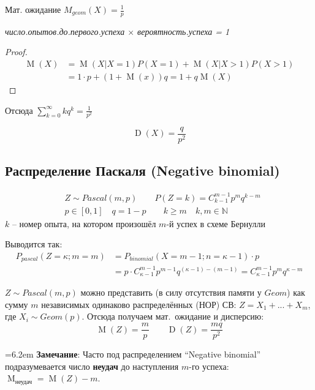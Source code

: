 \documentclass[a4paper,12pt,fleqn]{article}
\newenvironment{onsamepage} {\begin{minipage}{\textwidth}} {\end{minipage}}
\numberwithin{figure}{section}
\theoremstyle{definition}
\let\geqs\geqslant
\def\N{\mathbb{N}}
\DeclareMathOperator{\M}{M}
\DeclareMathOperator{\D}{D}
\begin{document}
\begin{onsamepage}
Мат. ожидание $M_{geom}(X) = \frac1p$
{\par\centering\it число.опытов.до.первого.успеха $\times$ вероятность.успеха = \rm1 \par}
\begin{proof}
\begin{align*}
 \M(X) &= \M(X|X=1) P(X=1) + \M(X|X>1) P(X>1) \\
	   &= 1\cdot p + (1+\M(x))q = 1 + q \M(X)
\end{align*}
\end{proof}
Отсюда $\sum_{k=0}^{\infty}kq^k = \frac1{p^2}$
\end{onsamepage}

\[ \D(X)=\frac{q}{p^2} \]


\subsection{Распределение Паскаля (Negative binomial)}

\begin{onsamepage}
\begin{align*}
&	Z \sim Pascal(m,p) \qquad P(Z=k)=C_{k-1}^{m-1} p^m q^{k-m} \\
&	p\in[0,1] \quad q=1-p  \qquad  k \geqs m \quad k,m\in\N
\end{align*}
$k$ -- номер опыта, на котором произошёл $m$-й успех в схеме Бернулли

\medskip
\def\kh{\kappa}
\def\mh{m}
Выводится так:
\begin{align*}
P_{pascal}(Z=\kh;m=\mh) &= P_{binomial}(X=\mh-1; n=\kh-1) \cdot p		\\
						&= p \cdot C_{\kh-1}^{\mh-1} p^{\mh-1} q^{(\kh-1)-(\mh-1)}
						= C_{\kh-1}^{\mh-1} p^{\mh} q^{\kh-\mh}
\end{align*}
\end{onsamepage}

$Z \sim Pascal(m,p)$ можно представить (в силу отсутствия памяти у $Geom$)
как сумму $m$ независимых одинаково распределённых (НОР) СВ:
		$Z=X_1+...+X_m$, где $X_i \sim Geom(p)$.
Отсюда получаем \mbox{мат. ожидание} и дисперсию:  %
\[	\M(Z) = \frac{m}{p}	\qquad	\D(Z) = \frac{m q}{p^2} \]

\hangindent=6.2em 
\textbf{Замечание}: Часто под распределением ``Negative binomial''
подразумевается число \textbf{неудач} до наступления $m$-го успеха:
$\M_\text{неудач} = \M(Z)-m$.
\end{document}
